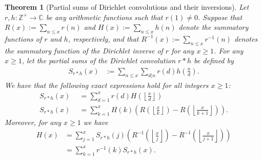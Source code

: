 \documentclass[11pt,reqno,a4letter]{article}
\numberwithin{equation}{section}
\numberwithin{figure}{section}
\numberwithin{table}{section}
\newcommand{\Floor}[2]{\ensuremath{\left\lfloor \frac{#1}{#2} \right\rfloor}}
\theoremstyle{plain}
\newtheorem{theorem}{Theorem}
\numberwithin{theorem}{section}
\theoremstyle{definition}
\begin{document}
\begin{theorem}[Partial sums of Dirichlet convolutions and their inversions] 
\label{theorem_SummatoryFuncsOfDirCvls} 
Let $r,h: \mathbb{Z}^{+} \rightarrow \mathbb{C}$ be any arithmetic functions such that $r(1) \neq 0$. 
Suppose that $R(x) := \sum_{n \leq x} r(n)$ and $H(x) := \sum_{n \leq x} h(n)$ denote the summatory 
functions of $r$ and $h$, respectively, and that $R^{-1}(x) := \sum_{n \leq x} r^{-1}(n)$ 
denotes the summatory function of the 
Dirichlet inverse of $r$ for any $x \geq 1$. 
For any $x \geq 1$, let the partial sums of the Dirichlet convolution $r \ast h$ be defined by 
\begin{align*} 
S_{r \ast h}(x) & := \sum_{n \leq x} \sum_{d|n} r(d) h\left(\frac{n}{d}\right). 
\end{align*}
We have that the following exact expressions hold 
for all integers $x \geq 1$: 
\begin{align*} 
S_{r \ast h}(x) & \phantom{:}= \sum_{d=1}^x r(d) H\left(\Floor{x}{d}\right) \\ 
S_{r \ast h}(x) & \phantom{:}= \sum_{k=1}^{x} H(k) \left(R\left(\Floor{x}{k}\right) - 
     R\left(\Floor{x}{k+1}\right)\right). 
\end{align*} 
Moreover, for any $x \geq 1$ we have 
\begin{align*} 
H(x) & = \sum_{j=1}^{x} S_{r \ast h}(j) \left(R^{-1}\left(\Floor{x}{j}\right) - 
     R^{-1}\left(\Floor{x}{j+1}\right)\right) \\ 
     & = \sum_{k=1}^{x} r^{-1}(k) S_{r \ast h}(x). 
\end{align*} 
\end{theorem} 
\end{document}
